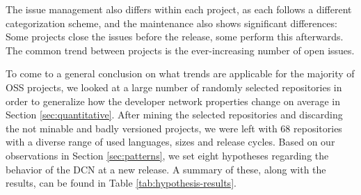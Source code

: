 The issue management also differs within each project, as each follows a different categorization scheme, and the maintenance also shows significant differences: Some projects close the issues before the release, some perform this afterwards. The common trend between projects is the ever-increasing number of open issues.

To come to a general conclusion on what trends are applicable for the majority of OSS projects, we looked at a large number of randomly selected repositories in order to generalize how the developer network properties change on average in Section \ref{sec:quantitative}. After mining the selected repositories and discarding the not minable and badly versioned projects, we were left with 68 repositories with a diverse range of used languages, sizes and release cycles. Based on our observations in Section \ref{sec:patterns}, we set eight hypotheses regarding the behavior of the DCN at a new release. A summary of these, along with the results, can be found in Table \ref{tab:hypothesis-results}. 

\begin{table}
    \centering
    \caption{Summary of the hypotheses results.}
    \label{tab:hypothesis-results}
\end{table}


